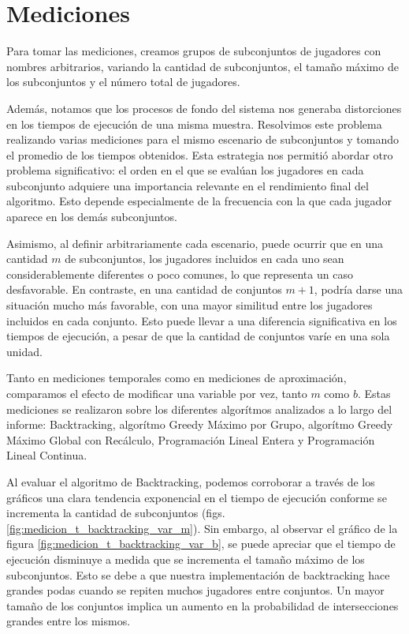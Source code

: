 \section{Mediciones}

Para tomar las mediciones, creamos grupos de subconjuntos de jugadores con nombres arbitrarios, variando la cantidad de subconjuntos, el tamaño máximo de los subconjuntos y el número total de jugadores.

Además, notamos que los procesos de fondo del sistema nos generaba distorciones en los tiempos de ejecución de una misma muestra. Resolvimos este problema realizando varias mediciones para el mismo escenario de subconjuntos y tomando el promedio de los tiempos obtenidos. Esta estrategia nos permitió abordar otro problema significativo: el orden en el que se evalúan los jugadores en cada subconjunto adquiere una importancia relevante en el rendimiento final del algoritmo. Esto depende especialmente de la frecuencia con la que cada jugador aparece en los demás subconjuntos. 

Asimismo, al definir arbitrariamente cada escenario, puede ocurrir que en una cantidad 
$m$ de subconjuntos, los jugadores incluidos en cada uno sean considerablemente diferentes o poco comunes, lo que representa un caso desfavorable. En contraste, en una cantidad de conjuntos $m+1$, podría darse una situación mucho más favorable, con una mayor similitud entre los jugadores incluidos en cada conjunto. Esto puede llevar a una diferencia significativa en los tiempos de ejecución, a pesar de que la cantidad de conjuntos varíe en una sola unidad.

Tanto en mediciones temporales como en mediciones de aproximación, comparamos el efecto de modificar una variable por vez, tanto $m$ como $b$. Estas mediciones se realizaron sobre los diferentes algorítmos analizados a lo largo del informe: Backtracking, algorítmo Greedy Máximo por Grupo, algorítmo Greedy Máximo Global con Recálculo, Programación Lineal Entera y Programación Lineal Continua.

Al evaluar el algoritmo de Backtracking, podemos corroborar a través de los gráficos una clara tendencia exponencial en el tiempo de ejecución conforme se incrementa la cantidad de subconjuntos (figs. \ref{fig:medicion_t_backtracking_var_m}). Sin embargo, al observar el gráfico de la figura \ref{fig:medicion_t_backtracking_var_b}, se puede apreciar que el tiempo de ejecución disminuye a medida que se incrementa el tamaño máximo de los subconjuntos. Esto se debe a que nuestra implementación de backtracking hace grandes podas cuando se repiten muchos jugadores entre conjuntos. Un mayor tamaño de los conjuntos implica un aumento en la probabilidad de intersecciones grandes entre los mismos.

